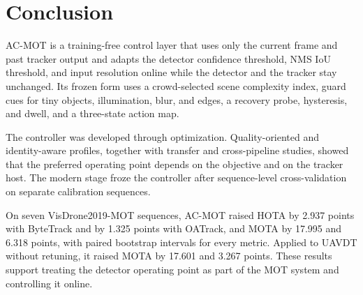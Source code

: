 \section{Conclusion}\label{sec:conclusion}

AC-MOT is a training-free control layer that uses only the current frame and
past tracker output and adapts the detector
confidence threshold, NMS IoU threshold, and input resolution online while the
detector and the tracker stay unchanged. Its frozen form uses a crowd-selected
scene complexity index, guard cues for tiny objects, illumination, blur, and
edges, a recovery probe, hysteresis, and dwell, and a three-state action map.

The controller was developed through optimization. Quality-oriented and
identity-aware profiles, together with transfer and cross-pipeline studies,
showed that the preferred operating point depends on the objective and on the
tracker host. The modern stage froze the controller after sequence-level
cross-validation on separate calibration sequences.

On seven VisDrone2019-MOT sequences, AC-MOT raised HOTA by 2.937 points with
ByteTrack and by 1.325 points with OATrack, and MOTA by 17.995 and 6.318
points, with paired bootstrap intervals for every metric. Applied to UAVDT
without retuning, it raised MOTA by 17.601 and 3.267 points. These results
support treating the detector operating point as part of the MOT system and
controlling it online.
